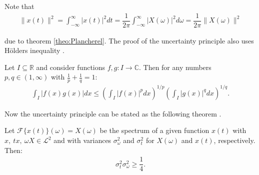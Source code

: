 Note that
\begin{align*}
\|x(t)\|^2 = \int_{-\infty}^\infty |x(t)|^2 dt = \dfrac{1}{2\pi} \int_{-\infty}^\infty |X(\omega)|^2 d\omega = \dfrac{1}{2\pi} \|X(\omega)\|^2
\end{align*}

due to theorem \ref{theo:Plancherel}. The proof of the uncertainty principle also uses Hölders inequality \cite{page 19, FSE2010}.
\begin{theorem} \label{theo:Hölder}
Let $I \subseteq \mathbb{R}$ and consider functions $f,g: I \to \mathbb{C}$. Then for any numbers $p,q \in (1,\infty)$ with $\frac{1}{p} + \frac{1}{q} = 1$:
\begin{align*}
\int_I |f(x) g(x)| dx \leq \left( \int_I |f(x)|^p dx \right)^{1/p} \left( \int_I |g(x)|^q dx \right)^{1/q}.
\end{align*}
\end{theorem}

Now the uncertainty principle can be stated as the following theorem \cite{pages 135-136, Wang}.

\begin{theorem} \label{theo:Heisenberg}
Let $\mathcal{F}\{x(t)\}(\omega) = X(\omega)$ be the spectrum of a given function $x(t)$ with $x, \ tx, \ \omega X \in \mathcal{L}^2$ and with variances $\sigma_\omega^2$ and $\sigma_t^2$ for $X(\omega)$ and $x(t)$, respectively. Then:
\begin{align*}
\sigma_t^2 \sigma_\omega^2 \geq \dfrac{1}{4}.
\end{align*}
\end{theorem}

